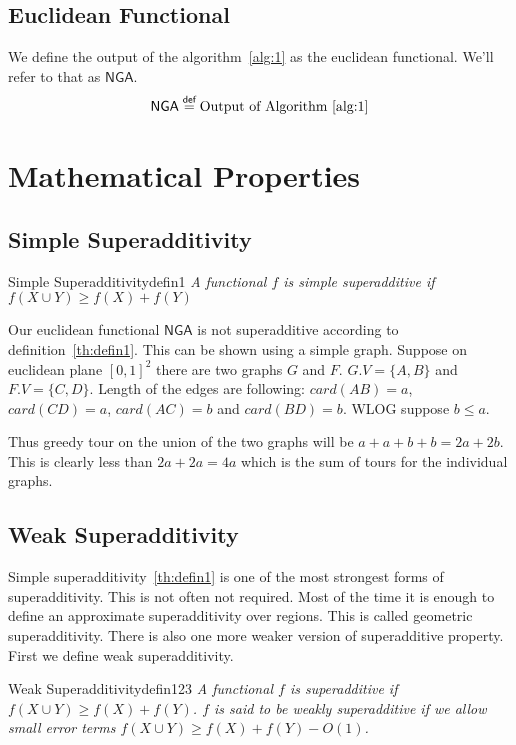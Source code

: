 \documentclass{article}
\begin{document}
\subsection{Euclidean Functional}
We define the output of the algorithm~\ref{alg:1} as the euclidean functional.
We'll refer to that as $\textsf{NGA}$.
\begin{align*}
    \textsf{NGA} \stackrel{\textsf{def}}{=} \text{Output of Algorithm~\ref{alg:1}}
\end{align*}

\section{Mathematical Properties}
\subsection{Simple Superadditivity}

\begin{define}{Simple Superadditivity}{defin1}
    \textit{A functional $f$ is simple superadditive if $f(X \cup Y) \geq f(X) + f(Y)$}
\end{define}

Our euclidean functional $\textsf{NGA}$ is not superadditive according to
definition~\ref{th:defin1}. This can be shown using a simple graph. Suppose on
euclidean plane $[0, 1]^2$ there are two graphs $G$ and $F$. $G.V = \{A, B\}$
and $F.V = \{C, D\}$. Length of the edges are following: $card(AB) = a$,
$card(CD) = a$, $card(AC) = b$ and $card(BD) = b$. WLOG suppose $b \leq a$.

Thus greedy tour on the union of the two graphs will be $a + a + b + b = 2a +
    2b$. This is clearly less than $2a + 2a = 4a$ which is the sum of tours for the
individual graphs.

\subsection*{Weak Superadditivity}

Simple superadditivity~\ref{th:defin1} is one of the most strongest forms of
superadditivity. This is not often not required. Most of the time it is enough
to define an approximate superadditivity over regions. This is called geometric
superadditivity. There is also one more weaker version of superadditive
property. First we define weak superadditivity.

\begin{define}{Weak Superadditivity}{defin123}
    \textit{A functional $f$ is superadditive if $f(X \cup Y) \ge f(X) + f(Y) $.
        $f$ is said to be weakly superadditive if we allow small error terms
        $f(X \cup Y) \ge f(X) + f(Y) - O(1)$.}
\end{define}
\end{document}
